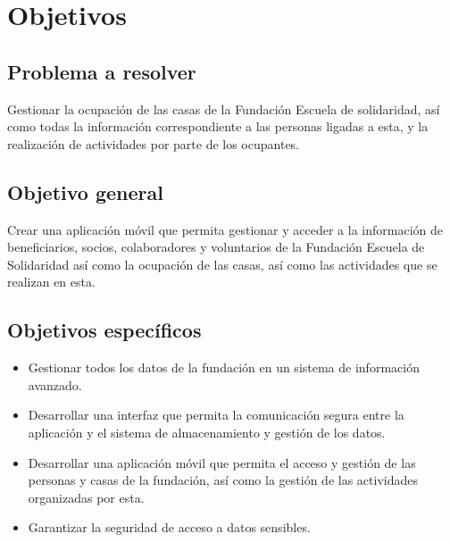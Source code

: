 \section{Objetivos}

\subsection{Problema a resolver}

Gestionar la ocupación de las casas de la Fundación Escuela de solidaridad, así como todas la información correspondiente a las personas ligadas a esta, y la realización de actividades por parte de los ocupantes.

\subsection{Objetivo general}

Crear una aplicación móvil que permita gestionar y acceder a la información de beneficiarios, socios, colaboradores y voluntarios de la Fundación Escuela de Solidaridad así como la ocupación de las casas, así como las actividades que se realizan en esta.

\subsection{Objetivos específicos}

\begin{itemize}
    \item Gestionar todos los datos de la fundación en un sistema de información avanzado.
    \item Desarrollar una interfaz que permita la comunicación segura entre la aplicación y el sistema de almacenamiento y gestión de los datos.
    \item Desarrollar una aplicación móvil que permita el acceso y gestión de las personas y casas de la fundación, así como la gestión de las actividades organizadas por esta.
    \item Garantizar la seguridad de acceso a datos sensibles.
\end{itemize}
